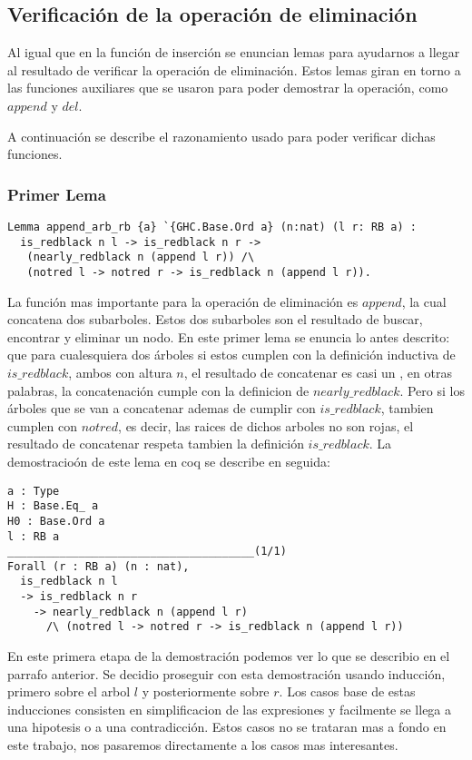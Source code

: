 \subsection{Verificación de la operación de eliminación}
Al igual que en la funci\'on de inserci\'on se enuncian lemas para ayudarnos a llegar al resultado
de verificar la operación de eliminación. Estos lemas giran en torno a las funciones auxiliares
que se usaron para poder demostrar la operación, como $append$ y $del$.

A continuación se describe el razonamiento usado para poder verificar dichas funciones.

\subsubsection{Primer Lema}
\begin{verbatim}
Lemma append_arb_rb {a} `{GHC.Base.Ord a} (n:nat) (l r: RB a) :
  is_redblack n l -> is_redblack n r ->
   (nearly_redblack n (append l r)) /\
   (notred l -> notred r -> is_redblack n (append l r)).
\end{verbatim}

La funci\'on mas importante para la operaci\'on de eliminaci\'on es $append$, la cual concatena
dos subarboles. Estos dos subarboles son el resultado de buscar, encontrar y eliminar un nodo. En
este primer lema se enuncia lo antes descrito: que para cualesquiera dos \'arboles si estos
cumplen con la definici\'on inductiva de $is\_redblack$, ambos con altura $n$, el resultado de
concatenar es casi un {\arn}, en otras palabras, la concatenaci\'on cumple con la definicion de
$nearly\_redblack$. Pero si los \'arboles que se van a concatenar ademas de cumplir con
$is\_redblack$, tambien cumplen con $notred$, es decir, las raices de dichos arboles no son rojas,
el resultado de concatenar respeta tambien la definici\'on $is\_redblack$. La demostracio\'on de
este lema en coq se describe en seguida:
\begin{verbatim}
a : Type
H : Base.Eq_ a
H0 : Base.Ord a
l : RB a
______________________________________(1/1)
Forall (r : RB a) (n : nat),
  is_redblack n l
  -> is_redblack n r
    -> nearly_redblack n (append l r)
      /\ (notred l -> notred r -> is_redblack n (append l r))
\end{verbatim}

En este primera etapa de la demostraci\'on podemos ver lo que se describio en el parrafo anterior.
Se decidio proseguir con esta demostraci\'on usando inducci\'on, primero sobre el arbol $l$ y
posteriormente sobre $r$. Los casos base de estas inducciones consisten en simplificacion de las
expresiones y facilmente se llega a una hipotesis o a una contradicci\'on. Estos casos no se
trataran mas a fondo en este trabajo, nos pasaremos directamente a los casos mas interesantes.

